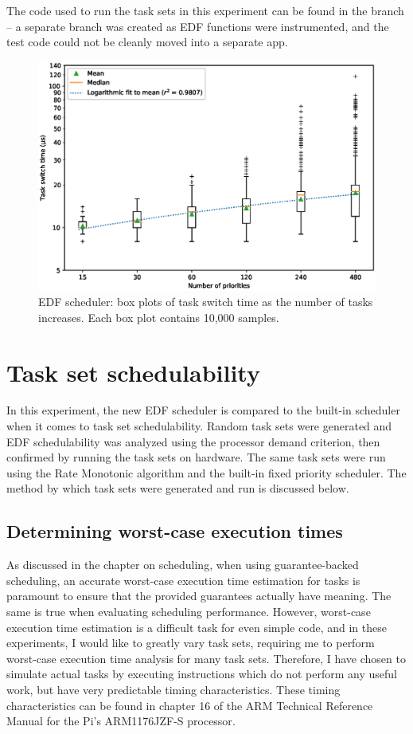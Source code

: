 The code used to run the task sets in this experiment can be found in the  branch -- a separate branch was created as EDF functions were instrumented, and the test code could not be cleanly moved into a separate app.

\begin{figure}[htpb]
    \centering
    \includegraphics[width=\textwidth]{figures/edfboxplot.eps}
    \caption{EDF scheduler: box plots of task switch time as the number of tasks increases. Each box plot contains 10,000 samples.}
    \label{fig:edfboxplot}
\end{figure}

\section{Task set schedulability}
In this experiment, the new EDF scheduler is compared to the built-in scheduler when it comes to task set schedulability. Random task sets were generated and EDF schedulability was analyzed using the processor demand criterion, then confirmed by running the task sets on hardware. The same task sets were run using the Rate Monotonic algorithm and the built-in fixed priority scheduler. The method by which task sets were generated and run is discussed below.

\subsection{Determining worst-case execution times}
As discussed in the chapter on scheduling, when using guarantee-backed scheduling, an accurate worst-case execution time estimation for tasks is paramount to ensure that the provided guarantees actually have meaning. The same is true when evaluating scheduling performance. However, worst-case execution time estimation is a difficult task for even simple code, and in these experiments, I would like to greatly vary task sets, requiring me to perform worst-case execution time analysis for many task sets. Therefore, I have chosen to simulate actual tasks by executing instructions which do not perform any useful work, but have very predictable timing characteristics. These timing characteristics can be found in chapter 16 of the ARM Technical Reference Manual for the Pi's ARM1176JZF-S processor\cite{arm:arm1176}.\\


